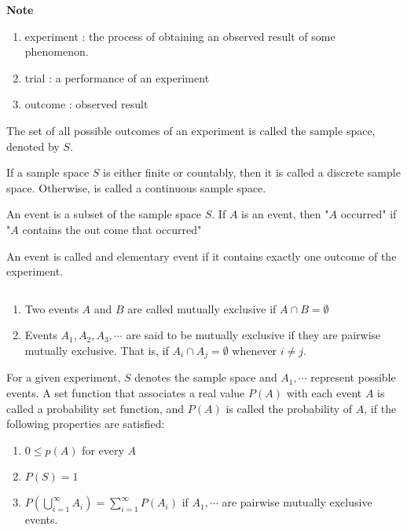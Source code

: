 


\cfoot{\thepage} %

\textbf{Note}

\begin{enumerate}[wide, label = $\bullet$]
	\item experiment : the process of obtaining an observed result of some phenomenon.
	\item trial : a performance of an experiment
	\item outcome : observed result
\end{enumerate}

\begin{defn}
	The set of all possible outcomes of an experiment is called the sample space, denoted by $S$.
\end{defn}

\begin{defn}
	If a sample space $S$ is either finite or countably, then it is called a discrete sample space. Otherwise, is called a continuous sample space.
\end{defn}

\begin{defn}
	An event is a subset of the sample space $S$. If $A$ is an event, then "$A$ occurred" if "$A$ contains the out come that occurred"
\end{defn}

\begin{defn}
	An event is called and elementary event if it contains exactly one outcome of the experiment.
\end{defn}

\begin{defn}$ $
	\begin{enumerate}[wide, label = $\bullet$]
		\item Two events $A$ and $B$ are called mutually exclusive if $A \cap B = \emptyset$
		\item Events $A_1,A_2,A_3,\cdots$ are said to be mutually exclusive if they are pairwise mutually exclusive. That is, if $A_i \cap A_j = \emptyset$ whenever $i \neq j$.
	\end{enumerate}
\end{defn}

\begin{defn}
	For a given experiment, $S$ denotes the sample space and $A_1,\cdots$ represent possible events. A set function that associates a real value $P(A)$ with each event $A$ is called a probability set function, and $P(A)$ is called the probability of $A$, if the following properties are satisfied:
	
	\begin{enumerate}[wide, label = $\roman*)$]
		\item $0 \leq p(A)$ for every $A$
		\item $P(S) = 1$
		\item $P(\bigcup_{i=1}^{\infty} A_i) = \sum^{\infty}_{i = 1}P(A_i)$ if $A_1,\cdots$ are pairwise mutually exclusive events.
	\end{enumerate}
\end{defn}

